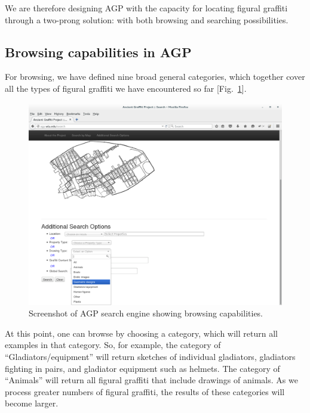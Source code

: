 \documentclass[amsthm,ebook]{saparticle}
\begin{document}
We are therefore designing AGP with the capacity for locating figural graffiti through a two-prong solution: with
both browsing and searching possibilities. 




\subsection{Browsing capabilities in AGP}


\noindent For browsing, we have defined nine broad general categories, which together cover all the types of figural graffiti
we have encountered so far [Fig.~\ref{fig:8}]. 

\begin{figure}[!bp]
\centering
 \includegraphics[width=\columnwidth]{EAGLE2016BenefielSypniewski-img008.png}
\caption{Screenshot of AGP search engine showing browsing capabilities.}
\label{fig:8}
\end{figure}
 


At this point, one can browse by choosing a category, which will return all examples in that category. So, for example,
the category of ``Gladiators/equipment'' will return sketches of individual gladiators, gladiators fighting in pairs, and
gladiator equipment such as helmets. The category of ``Animals'' will return all figural graffiti that include drawings
of animals. As we process greater numbers of figural graffiti, the results of these categories will become larger.
\end{document}
